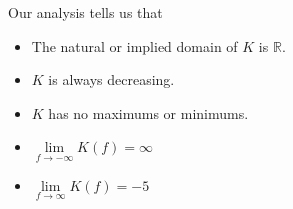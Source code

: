 \documentclass{ximera}
\begin{document}
\begin{example}
\begin{image}
\end{image}





Our analysis tells us that

\begin{itemize}
\item The natural or implied domain of $K$ is $\mathbb{R}$.
\item $K$ is always decreasing.
\item $K$ has no maximums or minimums.
\item $\lim\limits_{f \to -\infty} K(f) = \infty$
\item $\lim\limits_{f \to \infty} K(f) = -5$
\end{itemize}


\end{example}
\end{document}
